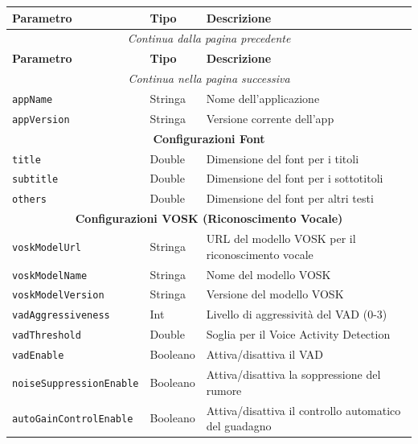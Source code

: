 \documentclass[14pt]{extbook}
\begin{document}
\begin{longtable}{| m{6cm} | m{3cm} | m{6cm} |}
    \hline
    \textbf{Parametro} & \textbf{Tipo} & \textbf{Descrizione} \\ \hline
    \endfirsthead

    \multicolumn{3}{c}{\textit{Continua dalla pagina precedente}} \\ \hline
    \textbf{Parametro} & \textbf{Tipo} & \textbf{Descrizione} \\ \hline
    \endhead

    \hline \multicolumn{3}{|c|}{\textit{Continua nella pagina successiva}} \\ \hline
    \endfoot
    \hline
    \endlastfoot

    \texttt{appName} & Stringa & Nome dell'applicazione \\ \hline
    \texttt{appVersion} & Stringa & Versione corrente dell'app \\ \hline

    \multicolumn{3}{|c|}{\textbf{Configurazioni Font}} \\ \hline
    \texttt{title} & Double & Dimensione del font per i titoli \\ \hline
    \texttt{subtitle} & Double & Dimensione del font per i sottotitoli \\ \hline
    \texttt{others} & Double & Dimensione del font per altri testi \\ \hline

    \multicolumn{3}{|c|}{\textbf{Configurazioni VOSK (Riconoscimento Vocale)}} \\ \hline
    \texttt{voskModelUrl} & Stringa & URL del modello VOSK per il riconoscimento vocale \\ \hline
    \texttt{voskModelName} & Stringa & Nome del modello VOSK \\ \hline
    \texttt{voskModelVersion} & Stringa & Versione del modello VOSK \\ \hline
    \texttt{vadAggressiveness} & Int & Livello di aggressività del VAD (0-3) \\ \hline
    \texttt{vadThreshold} & Double & Soglia per il Voice Activity Detection \\ \hline
    \texttt{vadEnable} & Booleano & Attiva/disattiva il VAD \\ \hline
    \texttt{noiseSuppressionEnable} & Booleano & Attiva/disattiva la soppressione del rumore \\ \hline
    \texttt{autoGainControlEnable} & Booleano & Attiva/disattiva il controllo automatico del guadagno \\ \hline


\end{longtable}
\end{document}
